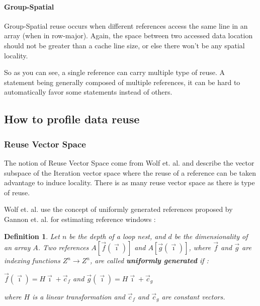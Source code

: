\documentclass[paper=a4, fontsize=11pt]{scrartcl}
\newtheorem{defn}{Definition}[section]
\numberwithin{equation}{section}        %
\numberwithin{figure}{section}          %
\numberwithin{table}{section}               %
\begin{document}
            \paragraph{Group-Spatial}
                Group-Spatial reuse occurs when different references access the same
                line in an array (when in row-major). Again, the space between
                two accessed data location should not be greater than a cache line size,
                or else there won't be any spatial locality.
                

                So as you can see, a single reference can carry multiple type of reuse.
                A statement being generally composed of multiple references, it 
                can be hard to automatically favor some statements instead of others.
    \subsection{How to profile data reuse}
        \subsubsection{Reuse Vector Space}
            The notion of Reuse Vector Space come from Wolf et. al.\cite{Wolf'91} and describe
            the vector subspace of the Iteration vector space where the reuse of
            a reference can be taken advantage to induce locality.
            There is as many reuse vector space as there is type of reuse.

            Wolf et. al. use the concept of uniformly generated references proposed
            by Gannon et. al.\cite{Gannon:1988:SCL:50454.50460} for estimating reference
            windows :
            \begin{defn}
            \label{sec:uniformly_generated}
                Let $n$ be the depth of a loop nest, and $d$ be the dimensionality of
                an array $A$. Two references $A[\vec{f}(\vec{\imath})]$ and
                $A[\vec{g}(\vec{\imath})]$, where $\vec{f}$ and $\vec{g}$ are indexing
                functions $Z^{n} \rightarrow Z^{n}$, are called \textbf{uniformly generated} if :
                \begin{center}
                    $\vec{f}(\vec{\imath}) = H\vec{\imath}+\vec{c}_f$ and $\vec{g}(\vec{\imath}) = H\vec{\imath}+\vec{c}_g$
                \end{center}
                where $H$ is a linear transformation and $\vec{c}_f$ and $\vec{c}_g$ are constant vectors.
            \end{defn}
            
\end{document}
